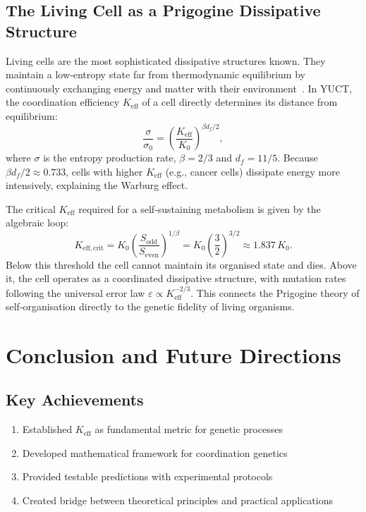 \documentclass[12pt]{article}
\newcommand{\Keff}{K_{\mathrm{eff}}}
\begin{document}
	\subsection{The Living Cell as a Prigogine Dissipative Structure}
	\label{subsec:prigogine}
	
	Living cells are the most sophisticated dissipative structures known.
	They maintain a low‑entropy state far from thermodynamic equilibrium by
	continuously exchanging energy and matter with their environment~\cite{Prigogine1977}.
	In YUCT, the coordination efficiency $\Keff$ of a cell directly determines
	its distance from equilibrium:
	\begin{equation}
		\frac{\sigma}{\sigma_0} = \left( \frac{\Keff}{K_0} \right)^{\beta d_f / 2},
	\end{equation}
	where $\sigma$ is the entropy production rate, $\beta=2/3$ and $d_f=11/5$.
	Because $\beta d_f / 2 \approx 0.733$, cells with higher $\Keff$ (e.g.,
	cancer cells) dissipate energy more intensively, explaining the Warburg effect.
	
	The critical $\Keff$ required for a self‑sustaining metabolism is given by
	the algebraic loop:
	\begin{equation}
K_{\mathrm{eff},\mathrm{crit}} = K_0 \left( \frac{S_{\mathrm{odd}}}{S_{\mathrm{even}}} \right)^{1/\beta}
= K_0 \left( \frac{3}{2} \right)^{3/2} \approx 1.837\,K_0 .
	\end{equation}
	Below this threshold the cell cannot maintain its organised state and dies.
	Above it, the cell operates as a coordinated dissipative structure, with
	mutation rates following the universal error law $\varepsilon \propto \Keff^{-2/3}$.
	This connects the Prigogine theory of self‑organisation directly to the
	genetic fidelity of living organisms.
	
	\section{Conclusion and Future Directions}
	
	\subsection{Key Achievements}
	
	\begin{enumerate}
		\item Established $K_{\text{eff}}$ as fundamental metric for genetic processes
		\item Developed mathematical framework for coordination genetics
		\item Provided testable predictions with experimental protocols
		\item Created bridge between theoretical principles and practical applications
	\end{enumerate}
	
\end{document}
